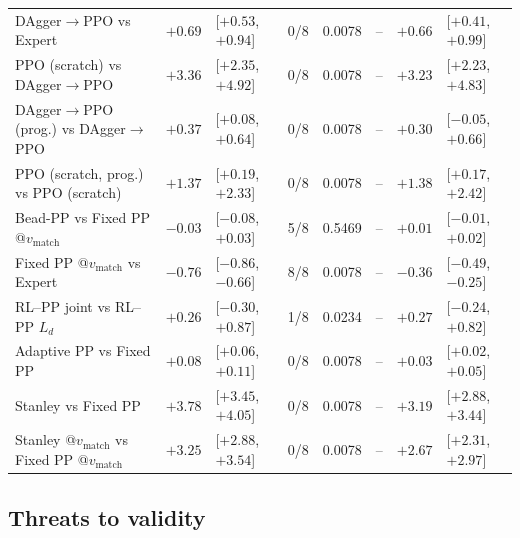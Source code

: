 \documentclass[10pt,twocolumn,twoside]{article}
\newcommand{\vmatch}{v_{\mathrm{match}}}
\newcommand{\Ld}{L_d}
\newcommand{\dpo}{DAgger$\to$PPO}
\begin{document}
\begin{table}[t]
{\begin{tabular}{@{}lrlcccrl@{}}
\dpo{} vs Expert                                  & $+0.69$ & [$+0.53$, $+0.94$] & 0/8 & 0.0078 & -- & $+0.66$ & [$+0.41$, $+0.99$]\\
PPO (scratch) vs \dpo{}                           & $+3.36$ & [$+2.35$, $+4.92$] & 0/8 & 0.0078 & -- & $+3.23$ & [$+2.23$, $+4.83$]\\
\dpo{} (prog.) vs \dpo{}                          & $+0.37$ & [$+0.08$, $+0.64$] & 0/8 & 0.0078 & -- & $+0.30$ & [$-0.05$, $+0.66$]\\
PPO (scratch, prog.) vs PPO (scratch)             & $+1.37$ & [$+0.19$, $+2.33$] & 0/8 & 0.0078 & -- & $+1.38$ & [$+0.17$, $+2.42$]\\
Bead-PP vs Fixed PP @$\vmatch$                    & $-0.03$ & [$-0.08$, $+0.03$] & 5/8 & 0.5469 & -- & $+0.01$ & [$-0.01$, $+0.02$]\\
Fixed PP @$\vmatch$ vs Expert                     & $-0.76$ & [$-0.86$, $-0.66$] & 8/8 & 0.0078 & -- & $-0.36$ & [$-0.49$, $-0.25$]\\
RL--PP joint vs RL--PP $\Ld$                      & $+0.26$ & [$-0.30$, $+0.87$] & 1/8 & 0.0234 & -- & $+0.27$ & [$-0.24$, $+0.82$]\\
Adaptive PP vs Fixed PP                           & $+0.08$ & [$+0.06$, $+0.11$] & 0/8 & 0.0078 & -- & $+0.03$ & [$+0.02$, $+0.05$]\\
Stanley vs Fixed PP                               & $+3.78$ & [$+3.45$, $+4.05$] & 0/8 & 0.0078 & -- & $+3.19$ & [$+2.88$, $+3.44$]\\
Stanley @$\vmatch$ vs Fixed PP @$\vmatch$         & $+3.25$ & [$+2.88$, $+3.54$] & 0/8 & 0.0078 & -- & $+2.67$ & [$+2.31$, $+2.97$]\\
\bottomrule
\end{tabular}}
\end{table}

\subsection{Threats to validity}
\end{document}
